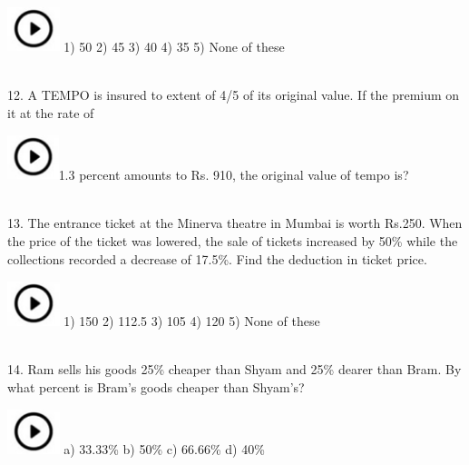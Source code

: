 \documentclass{article}
\begin{document}
\noindent   \includegraphics*[width=0.60in, height=0.52in]{images/image1} 1) 50                        2) 45                 3) 40                 4) 35                 5) None of these

\noindent 

\noindent 

\noindent \\
12. A TEMPO is insured to extent of 4/5 of its original value. If the premium on it at the rate of

\noindent 

\noindent \includegraphics*[width=0.59in, height=0.52in]{images/image1}1.3 percent amounts to Rs. 910, the original value of tempo is?

\noindent 

\noindent 

\noindent 

\noindent \\
13. The entrance ticket at the Minerva theatre in Mumbai is worth Rs.250. When the price of the ticket was lowered, the sale of tickets increased by 50\% while    the collections recorded a decrease of 17.5\%. Find the deduction in ticket price.

\noindent 

\noindent   \includegraphics*[width=0.60in, height=0.52in]{images/image1} 1) 150                      2) 112.5            3) 105               4) 120               5) None of these

\noindent 

\noindent 

\noindent 

\noindent \\
14. Ram sells his goods 25\% cheaper than Shyam and 25\% dearer than Bram. By what percent is Bram's goods cheaper than Shyam's?

\noindent   \includegraphics*[width=0.60in, height=0.52in]{images/image1} a) 33.33\%               b) 50\%              c) 66.66\%         d) 40\%
\end{document}
